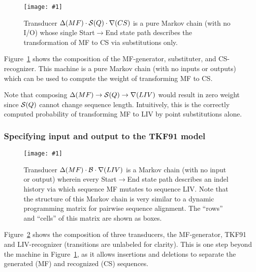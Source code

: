 \documentclass{article}
\newcommand{\figref}[1]{Figure~\ref{Figures.#1}}
\newcommand{\figlabel}[1]{\label{Figures.#1}}
\newcommand{\easyfig}[4]{
\begin{figure}
\texttt{[image: \#1]}
\caption{ \figlabel{#3} #4}
\end{figure}}
\newcommand{\pdffig}[2]{\easyfig{#1-fig.pdf}{}{#1}{#2}}
\newcommand{\widepdffig}[2]{\easyfig{#1-fig.pdf}{width=\textwidth}{#1}{#2}}
\newcommand\substitute{{\cal S}}
\newcommand\tkf{{\cal B}}
\newcommand\generate{\Delta}
\newcommand\recognize{\nabla}
\begin{document}
\pdffig{mf-substituter-cs}{Transducer $\generate(MF) \cdot \substitute(Q) \cdot \recognize(CS)$ is a pure Markov chain (with no I/O) whose single Start$\to$End state path describes the transformation of MF to CS via substitutions only. }

\figref{mf-substituter-cs} shows the composition of the MF-generator, substituter, and CS-recognizer.  
This machine is a pure Markov chain (with no inputs or outputs) which can be used to compute 
the weight of transforming MF to CS.  

Note that composing $\generate(MF) \to \substitute(Q) \to \recognize(LIV) $
would result in zero weight since $\substitute(Q)$ cannot change sequence length.  
Intuitively, this is the correctly computed probability of transforming MF to LIV by point substitutions alone.  


\subsubsection{Specifying input and output to the TKF91 model}

\widepdffig{mf-tkf91-liv}{Transducer $\generate(MF) \cdot \tkf \cdot \recognize(LIV)$ is a Markov chain (with no input or output) wherein every Start$\to$End state path describes an indel history
via which sequence MF mutates to sequence LIV. Note that the structure of this Markov chain is very similar to a dynamic programming matrix for pairwise sequence alignment. The ``rows'' and ``cells'' of this matrix are shown as boxes.}

\figref{mf-tkf91-liv} shows the composition of three transducers, the MF-generator, TKF91 and LIV-recognizer
(transitions are unlabeled for clarity).
This is one step beyond the machine in \figref{mf-substituter-cs}, as it allows 
insertions and deletions to separate the generated (MF) and recognized (CS) sequences.  
\end{document}
